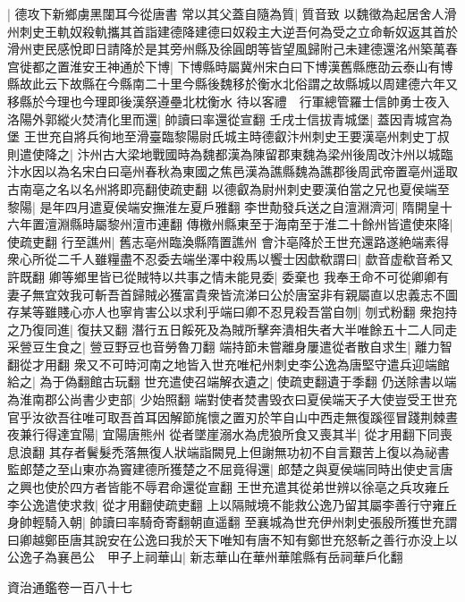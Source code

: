 |{
	德攻下新鄉虜黑闥耳今從唐書}
常以其父蓋自隨為質|{
	質音致}
以魏徵為起居舍人滑州刺史王軌奴殺軌攜其首詣建德降建德曰奴殺主大逆吾何為受之立命斬奴返其首於滑州吏民感悅即日請降於是其旁州縣及徐圓朗等皆望風歸附己未建德還洺州築萬春宫徙都之置淮安王神通於下博|{
	下博縣時屬冀州宋白曰下博漢舊縣應劭云泰山有博縣故此云下故縣在今縣南二十里今縣後魏移於衡水北俗謂之故縣城以周建德六年又移縣於今理也今理即後漢祭遵壘北枕衡水}
待以客禮　行軍總管羅士信帥勇士夜入洛陽外郭縱火焚清化里而還|{
	帥讀曰率還從宣翻}
壬戌士信拔青城堡|{
	蓋因青城宫為堡}
王世充自將兵徇地至滑臺臨黎陽尉氏城主時德叡汴州刺史王要漢亳州刺史丁叔則遣使降之|{
	汴州古大梁地戰國時為魏都漢為陳留郡東魏為梁州後周改汴州以城臨汴水因以為名宋白曰亳州春秋為東國之焦邑漢為譙縣魏為譙郡後周武帝置亳州遥取古南亳之名以名州將即亮翻使疏吏翻}
以德叡為尉州刺史要漢伯當之兄也夏侯端至黎陽|{
	是年四月遣夏侯端安撫淮左夏戶雅翻}
李世勣發兵送之自澶淵濟河|{
	隋開皇十六年置澶淵縣時屬黎州澶市連翻}
傳檄州縣東至于海南至于淮二十餘州皆遣使來降|{
	使疏吏翻}
行至譙州|{
	舊志亳州臨渙縣隋置譙州}
會汴亳降於王世充還路遂絶端素得衆心所從二千人雖糧盡不忍委去端坐澤中殺馬以饗士因歔欷謂曰|{
	歔音虚欷音希又許既翻}
卿等鄉里皆已從賊特以共事之情未能見委|{
	委棄也}
我奉王命不可從卿卿有妻子無宜效我可斬吾首歸賊必獲富貴衆皆流涕曰公於唐室非有親屬直以忠義志不圖存某等雖賤心亦人也寧肯害公以求利乎端曰卿不忍見殺吾當自刎|{
	刎式粉翻}
衆抱持之乃復同進|{
	復扶又翻}
潛行五日餒死及為賊所擊奔潰相失者大半唯餘五十二人同走采䝁豆生食之|{
	䝁豆野豆也音勞魯刀翻}
端持節未嘗離身屢遣從者散自求生|{
	離力智翻從才用翻}
衆又不可時河南之地皆入世充唯杞州刺史李公逸為唐堅守遣兵迎端館給之|{
	為于偽翻館古玩翻}
世充遣使召端解衣遺之|{
	使疏吏翻遺于季翻}
仍送除書以端為淮南郡公尚書少吏部|{
	少始照翻}
端對使者焚書毁衣曰夏侯端天子大使豈受王世充官乎汝欲吾往唯可取吾首耳因解節旄懷之置刃於竿自山中西走無復蹊徑冒踐荆棘晝夜兼行得達宜陽|{
	宜陽唐熊州}
從者墜崖溺水為虎狼所食又喪其半|{
	從才用翻下同喪息浪翻}
其存者鬢髮禿落無復人狀端詣闕見上但謝無功初不自言艱苦上復以為祕書監郎楚之至山東亦為竇建德所獲楚之不屈竟得還|{
	郎楚之與夏侯端同時出使史言唐之興也使於四方者皆能不辱君命還從宣翻}
王世充遣其從弟世辨以徐亳之兵攻雍丘李公逸遣使求救|{
	從才用翻使疏吏翻}
上以隔賊境不能救公逸乃留其屬李善行守雍丘身帥輕騎入朝|{
	帥讀曰率騎奇寄翻朝直遥翻}
至襄城為世充伊州刺史張殷所獲世充謂曰卿越鄭臣唐其說安在公逸曰我於天下唯知有唐不知有鄭世充怒斬之善行亦没上以公逸子為襄邑公　甲子上祠華山|{
	新志華山在華州華隂縣有岳祠華戶化翻}


資治通鑑卷一百八十七
